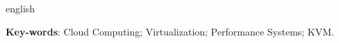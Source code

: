 \begin{resumo}[Abstract]
\begin{otherlanguage*}{english}
   \vspace{\onelineskip}
 
   \noindent 
   \textbf{Key-words}: Cloud Computing; Virtualization; Performance Systems; KVM.
 \end{otherlanguage*}
\end{resumo}
